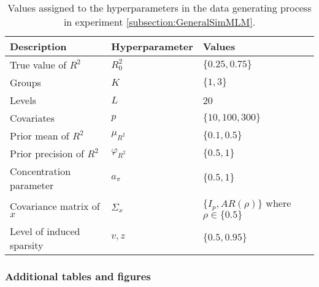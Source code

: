 \begin{table}[ht]
\centering
\begin{tabular}{l|l|l}
Description & Hyperparameter  & {Values}                                      \\ \hline
True value of $R^2$ & $R^2_0$      & $\{0.25,0.75\}$                                     \\
Groups  & $K$             & $\{1,3\}$                                         \\
Levels & $L$             & 20                                                \\
Covariates & $p$             & $\{10,100,300\}$                                  \\
Prior mean of $R^2$ &$\mu_{R^2}$     & $\{0.1,0.5\}$                                 \\
Prior precision of $R^2$& $\varphi_{R^2}$ & $\{0.5,1\}$                                     \\
Concentration parameter & $a_\pi$         & \textbf{$\{0.5,1\}$}                          \\
Covariance matrix of $x$ & $\Sigma_x$      & $\{I_p, AR(\rho) \}$ where $\rho \in \{0.5\}$ \\
Level of induced sparsity &$v, z$      & $\{0.5,0.95\}$
\end{tabular}
\caption{Values assigned to the hyperparameters in the data generating process in experiment \ref{subsection:GeneralSimMLM}.  }
\label{tab:sim2datahyperparams}
\end{table}

\subsubsection{Additional tables and figures}


